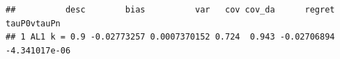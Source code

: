 \documentclass[11pt]{article}\usepackage[]{graphicx}\usepackage[table]{xcolor}
\makeatletter
\newenvironment{kframe}{%
 \def\at@end@of@kframe{}%
 \ifinner\ifhmode%
  \def\at@end@of@kframe{\end{minipage}}%
  \begin{minipage}{\columnwidth}%
 \fi\fi%
 \def\FrameCommand##1{\hskip\@totalleftmargin \hskip-\fboxsep
 \colorbox{shadecolor}{##1}\hskip-\fboxsep
     \hskip-\linewidth \hskip-\@totalleftmargin \hskip\columnwidth}%
 \MakeFramed {\advance\hsize-\width
   \@totalleftmargin\z@ \linewidth\hsize
   \@setminipage}}%
 {\par\unskip\endMakeFramed%
 \at@end@of@kframe}
\newenvironment{knitrout}{}{} %
\makeatother
\begin{document}
\begin{knitrout}
\begin{kframe}\begin{verbatim}
##          desc        bias          var   cov cov_da      regret   tauP0vtauPn
## 1 AL1 k = 0.9 -0.02773257 0.0007370152 0.724  0.943 -0.02706894 -4.341017e-06
\end{verbatim}
\end{kframe}
\end{knitrout}
\end{document}
